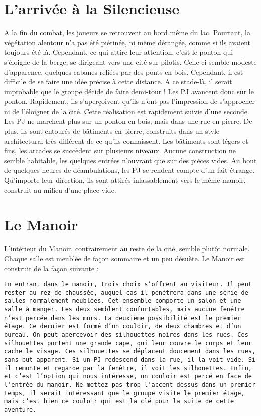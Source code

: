 \documentclass[a4paper]{article}
\begin{document}
\section{L'arrivée à la Silencieuse}
A la fin du combat, les joueurs se retrouvent au bord même du lac. Pourtant, la végétation alentour n'a pas été piétinée, ni même dérangée, comme si ils avaient toujours été là. Cependant, ce qui attire leur attention, c'est le ponton qui s'éloigne de la berge, se dirigeant vers une cité sur pilotis. Celle-ci semble modeste d'apparence, quelques cabanes reliées par des ponts en bois. Cependant, il est difficile de se faire une idée précise à cette distance. 
\newline
A ce stade-là, il serait improbable que le groupe décide de faire demi-tour ! Les PJ avancent donc sur le ponton. Rapidement, ils s'aperçoivent qu'ils n'ont pas l'impression de s'approcher ni de l'éloigner de la cité. Cette réalisation est rapidement suivie d'une seconde. Les PJ ne marchent plus sur un ponton en bois, mais dans une rue en pierre. De plus, ils sont entourés de bâtiments en pierre, construits dans un style architectural très différent de ce qu'ils connaissent. Les bâtiments sont légers et fins, les arcades se succèdent sur plusieurs niveaux. Aucune construction ne semble habitable, les quelques entrées n'ouvrant que sur des pièces vides. Au bout de quelques heures de déambulations, les PJ se rendent compte d'un fait étrange. Qu'importe leur direction, ils sont attirés inlassablement vers le même manoir, construit au milieu d'une place vide.
\section{Le Manoir}
L'intérieur du Manoir, contrairement au reste de la cité, semble plutôt normale. Chaque salle est meublée de façon sommaire et un peu désuète. Le Manoir est construit de la façon suivante :
\begin{flushright}
\texttt{En entrant dans le manoir, trois choix s'offrent au visiteur. Il peut rester au rez de chaussée, auquel cas il pénétrera dans une série de salles normalement meublées. Cet ensemble comporte un salon et une salle à manger. Les deux semblent confortables, mais aucune fenêtre n'est percée dans les murs. 
\newline
La deuxième possibilité est le premier étage. Ce dernier est formé d'un couloir, de deux chambres et d'un bureau. On peut apercevoir des silhouettes noires dans les rues. Ces silhouettes portent une grande cape, qui leur couvre le corps et leur cache le visage. Ces silhouettes se déplacent doucement dans les rues, sans but apparent. Si un PJ redescend dans la rue, il la voit vide. Si il remonte et regarde par la fenêtre, il voit les silhouettes.
\newline
Enfin, et c'est l'option qui nous intéresse, un couloir est percé en face de l'entrée du manoir. Ne mettez pas trop l'accent dessus dans un premier temps, il serait intéressant que le groupe visite le premier étage, mais c'est bien ce couloir qui est la clé pour la suite de cette aventure.}
\end{flushright}
\end{document}
